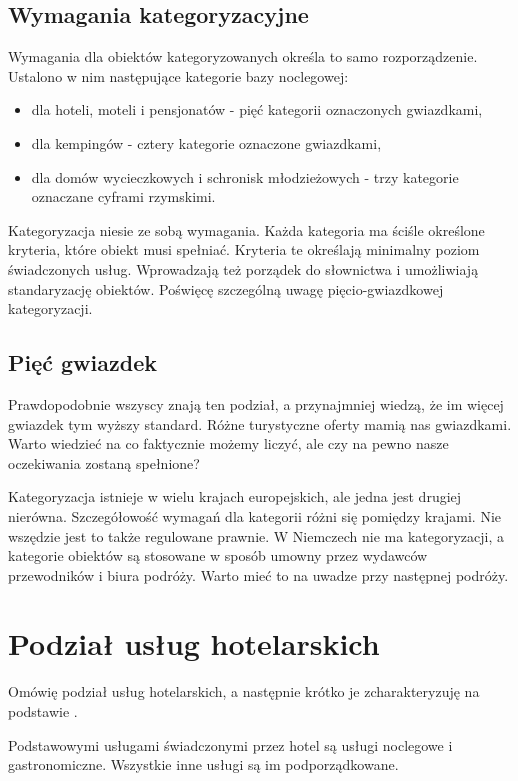 \documentclass[a4paper,onecolumn,oneside,11pt,wide,floatssmall]{mwrep}
\theoremstyle{definition}
\theoremstyle{plain}%
\theoremstyle{remark}
\begin{document}
\subsection{Wymagania kategoryzacyjne}
Wymagania dla obiektów kategoryzowanych określa to samo rozporządzenie. 
Ustalono w nim następujące kategorie bazy noclegowej:

\begin{itemize}
  \item dla hoteli, moteli i pensjonatów - pięć kategorii oznaczonych 
  gwiazdkami,
  \item dla kempingów - cztery kategorie oznaczone gwiazdkami,
  \item dla domów wycieczkowych i schronisk młodzieżowych - trzy kategorie 
  oznaczane cyframi rzymskimi.
\end{itemize}

Kategoryzacja niesie ze sobą wymagania. Każda kategoria ma ściśle określone 
kryteria, które obiekt musi spełniać. Kryteria te określają minimalny poziom 
świadczonych usług. Wprowadzają też porządek do słownictwa i umożliwiają 
standaryzację obiektów. Poświęcę szczególną uwagę pięcio-gwiazdkowej 
kategoryzacji.

\subsection{Pięć gwiazdek}
Prawdopodobnie wszyscy znają ten podział, a przynajmniej wiedzą, że im 
więcej gwiazdek tym wyższy standard. Różne turystyczne oferty mamią nas 
gwiazdkami. Warto wiedzieć na co faktycznie możemy liczyć, ale czy na pewno 
nasze oczekiwania zostaną spełnione? 

Kategoryzacja istnieje w wielu krajach 
europejskich, ale jedna jest drugiej nierówna. Szczegółowość wymagań dla 
kategorii różni się pomiędzy krajami. Nie wszędzie jest to także regulowane 
prawnie. W Niemczech nie ma kategoryzacji, a kategorie obiektów są stosowane 
w sposób umowny przez wydawców przewodników i biura podróży. Warto mieć to 
na uwadze przy następnej podróży.

\section{Podział usług hotelarskich}   
Omówię podział usług hotelarskich, a następnie krótko je zcharakteryzuję na 
podstawie \cite[8-10]{OrgaDzialHot}.

Podstawowymi usługami świadczonymi przez hotel są usługi noclegowe i 
gastronomiczne. Wszystkie inne usługi są im podporządkowane.
\end{document}
